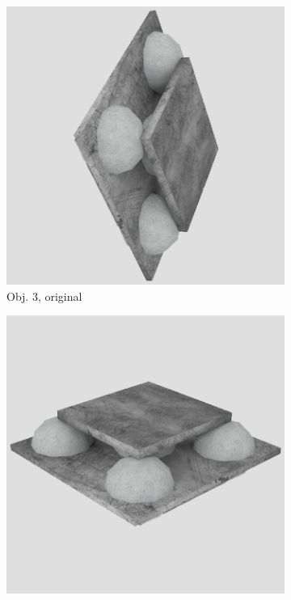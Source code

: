\begin{figure}
\medskip
\begin{subfigure}{0.2\textwidth}
\includegraphics[width=\linewidth]{Bilder/Objekt3A.png}
\caption{Obj. 3, original} \label{fig:c}
\end{subfigure}\hspace{.5cm} %
\begin{subfigure}{0.2\textwidth}
\includegraphics[width=\linewidth]{Bilder/Objekt3B.png}

\end{subfigure}
\end{figure}
